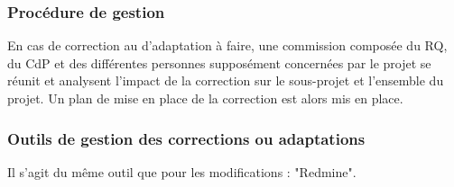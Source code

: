     \subsubsection{Procédure de gestion}
    En cas de correction au d'adaptation à faire, une commission composée du 
RQ, du CdP et des différentes personnes supposément concernées par le projet se 
réunit et analysent l'impact de la correction sur le sous-projet et l'ensemble 
du projet.
    Un plan de mise en place de la correction est alors mis en place.

    \subsubsection{Outils de gestion des corrections ou adaptations}
    Il s'agit du même outil que pour les modifications : "Redmine".
